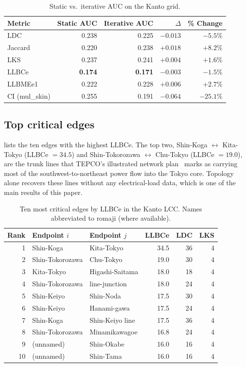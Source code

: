 \documentclass[11pt,a4paper]{article}
\begin{document}
\begin{table}[h]
\centering
\small
\caption{Static vs.\ iterative AUC on the Kanto grid.}
\label{tab:tokyo-iter}
\begin{tabular}{lrrrr}
\toprule
Metric & Static AUC & Iterative AUC & $\Delta$ & \% Change \\
\midrule
LDC                 & 0.238 & 0.225 & $-0.013$ & $-5.5\%$ \\
Jaccard             & 0.220 & 0.238 & $+0.018$ & $+8.2\%$ \\
LKS                 & 0.237 & 0.241 & $+0.004$ & $+1.6\%$ \\
LLBCe               & \textbf{0.174} & \textbf{0.171} & $-0.003$ & $-1.5\%$ \\
LLBMEe1             & 0.222 & 0.228 & $+0.006$ & $+2.7\%$ \\
CI (mul\_skin)      & 0.255 & 0.191 & $-0.064$ & $-25.1\%$ \\
\bottomrule
\end{tabular}
\end{table}

\subsection{Top critical edges}
 lists the ten edges with the highest LLBCe. The top
two, Shin-Koga $\leftrightarrow$ Kita-Tokyo (LLBCe $= 34.5$) and
Shin-Tokorozawa $\leftrightarrow$ Chu-Tokyo (LLBCe $= 19.0$), are the
trunk lines that TEPCO's illustrated network plan~\cite{tepco2024network}
marks as carrying most of the southwest-to-northeast power flow into the
Tokyo core. Topology alone recovers these lines without any
electrical-load data, which is one of the main results of this paper.

\begin{table}[h]
\centering
\small
\caption{Ten most critical edges by LLBCe in the Kanto LCC.
Names abbreviated to romaji (where available).}
\label{tab:top-edges}
\begin{tabular}{rllrrr}
\toprule
Rank & Endpoint $i$ & Endpoint $j$ & LLBCe & LDC & LKS \\
\midrule
1 & Shin-Koga       & Kita-Tokyo      & 34.5 & 36 & 4 \\
2 & Shin-Tokorozawa & Chu-Tokyo       & 19.0 & 30 & 4 \\
3 & Kita-Tokyo      & Higashi-Saitama & 18.0 & 18 & 4 \\
4 & Shin-Tokorozawa & line-junction   & 18.0 & 24 & 4 \\
5 & Shin-Keiyo      & Shin-Noda       & 17.5 & 30 & 4 \\
6 & Shin-Keiyo      & Hanami-gawa     & 17.5 & 24 & 4 \\
7 & Shin-Koga       & Shin-Keiyo line & 17.5 & 36 & 4 \\
8 & Shin-Tokorozawa & Minamikawagoe   & 16.8 & 24 & 4 \\
9 & (unnamed)       & Shin-Okabe      & 16.0 & 16 & 4 \\
10& (unnamed)       & Shin-Tama       & 16.0 & 16 & 4 \\
\bottomrule
\end{tabular}
\end{table}
\end{document}
